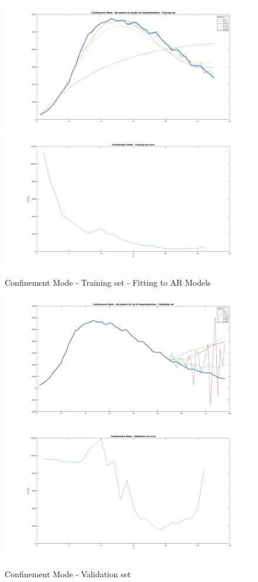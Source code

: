 \documentclass[11pt]{article}
\begin{document}
\begin{figure}[h!]
\centering
\includegraphics[scale=0.3]{Conf_train.jpg}
\includegraphics[scale=0.3]{Conf_Err_Train.jpg}
\caption{Confinement Mode - Training set - Fitting to AR Models}
\label{fig:Conf_train}
\end{figure}

\begin{figure}[h!]
\centering
\includegraphics[scale=0.3]{Conf_val.jpg}
\includegraphics[scale=0.3]{Conf_Err_Val.jpg}
\caption{Confinement Mode - Validation set}
\label{fig:Conf_val}
\end{figure}
\end{document}
